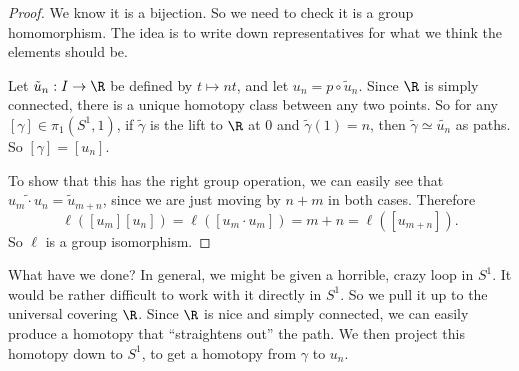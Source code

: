 \documentclass[a4paper]{article}
\begin{document}
\begin{proof}
  We know it is a bijection. So we need to check it is a group homomorphism. The idea is to write down representatives for what we think the elements should be.
  \begin{center}
  \end{center}
  Let $\tilde{u}_n: I \to \R$ be defined by $t \mapsto nt$, and let $u_n = p\circ \tilde{u}_n$. Since $\R$ is simply connected, there is a unique homotopy class between any two points. So for any $[\gamma] \in \pi_1(S^1, 1)$, if $\tilde{\gamma}$ is the lift to $\R$ at $0$ and $\tilde{\gamma}(1) = n$, then $\tilde{\gamma} \simeq \tilde{u_n}$ as paths. So $[\gamma] = [u_n]$.

  To show that this has the right group operation, we can easily see that $\widetilde{u_m \cdot u_n} = \tilde{u}_{m + n}$, since we are just moving by $n + m$ in both cases. Therefore
  \[
    \ell([u_m][u_n]) = \ell([u_m \cdot u_m]) = m + n = \ell([u_{m + n}]).
  \]
  So $\ell$ is a group isomorphism.
\end{proof}
What have we done? In general, we might be given a horrible, crazy loop in $S^1$. It would be rather difficult to work with it directly in $S^1$. So we pull it up to the universal covering $\R$. Since $\R$ is nice and simply connected, we can easily produce a homotopy that ``straightens out'' the path. We then project this homotopy down to $S^1$, to get a homotopy from $\gamma$ to $u_n$.
\end{document}
